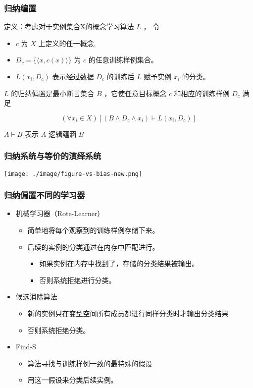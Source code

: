 \documentclass{beamer}
\begin{document}
\begin{frame}
\frametitle{归纳编置}
\label{sec-4-5}

定义：考虑对于实例集合X的概念学习算法  $L$  ， 令
\begin{itemize}
\item $c$  为 $X$ 上定义的任一概念,
\item $D_c = \{\langle x, c(x) \rangle \}$ 为 $c$ 的任意训练样例集合。
\item $L(x_i,D_c)$ 表示经过数据 $D_c$ 的训练后 $L$ 赋予实例 $x_i$ 的分类。
\end{itemize}

$L$ 的归纳偏置是最小断言集合 $B$ ，它使任意目标概念 $c$ 和相应的训练样例 $D_c$ 满足

\[
(\forall x_i \in X) [(B \land D_c \land x_i) \vdash L(x_i,D_c)]
\]

 $A \vdash B$ 表示 $A$  逻辑蕴涵 $B$
\end{frame}
\begin{frame}
\frametitle{归纳系统与等价的演绎系统}
\label{sec-4-6}

\center
\texttt{[image: ./image/figure-vs-bias-new.png]}
\end{frame}
\begin{frame}
\frametitle{归纳偏置不同的学习器}
\label{sec-4-7}

\begin{itemize}
\item 机械学习器（Rote-Learner）
\begin{itemize}
\item 简单地将每个观察到的训练样例存储下来。
\item 后续的实例的分类通过在内存中匹配进行。
\begin{itemize}
\item 如果实例在内存中找到了，存储的分类结果被输出。
\item 否则系统拒绝进行分类。
\end{itemize}
\end{itemize}
\item 候选消除算法
\begin{itemize}
\item 新的实例只在变型空间所有成员都进行同样分类时才输出分类结果
\item 否则系统拒绝分类。
\end{itemize}
\item Find-S
\begin{itemize}
\item 算法寻找与训练样例一致的最特殊的假设
\item 用这一假设来分类后续实例。
\end{itemize}
\end{itemize}
\end{frame}
\end{document}
